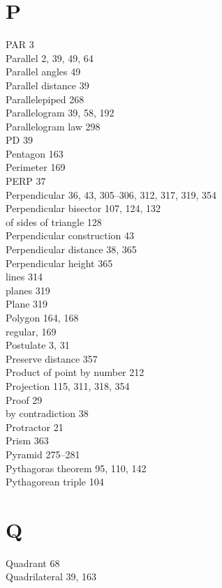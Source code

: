 \documentclass[12pt]{book} %
\begin{document}
\begin{ExerciseList}
\begin{ExerciseList}
\begin{ExerciseList}
\section*{P}
PAR 3\\
Parallel 2, 39, 49, 64\\
Parallel angles 49\\
Parallel distance 39\\
Parallelepiped 268\\
Parallelogram 39, 58, 192\\
Parallelogram law 298\\
PD 39\\
Pentagon 163\\
Perimeter 169\\
PERP 37\\
Perpendicular 36, 43, 305--306, 312, 317, 319, 354\\
Perpendicular bisector 107, 124, 132\\
\hspace*{1em}of sides of triangle 128\\
Perpendicular construction 43\\
Perpendicular distance 38, 365\\
Perpendicular height 365\\
\hspace*{1em}lines 314\\
\hspace*{1em}planes 319\\
Plane 319\\
Polygon 164, 168\\
\hspace*{1em}regular, 169\\
Postulate 3, 31\\
Preserve distance 357\\
Product of point by number 212\\
Projection 115, 311, 318, 354\\
Proof 29\\
\hspace*{1em}by contradiction 38\\
Protractor 21\\
Prism 363\\
Pyramid 275--281\\
Pythagoras theorem 95, 110, 142\\
Pythagorean triple 104\\

\section*{Q}
Quadrant 68\\
Quadrilateral 39, 163\\


\end{ExerciseList}
\end{ExerciseList}
\end{ExerciseList}
\end{document}
